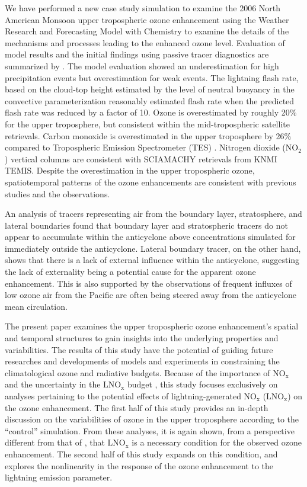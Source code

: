 We have performed a new case study simulation to examine the 2006 North American
Monsoon upper tropospheric ozone enhancement using the Weather Research and
Forecasting Model with Chemistry \citep{Skamarock:2008xx,Grell:2005fv}
to examine the details of the mechanisms and processes leading to the enhanced ozone level.
Evaluation of model results and the initial findings using passive tracer diagnostics are summarized
by \citet[][manscript in preparation]{Wong:2014xx}. The model evaluation showed an
underestimation for high precipitation events but overestimation for weak events. The
lightning flash rate, based on the cloud-top height estimated by the level of neutral
buoyancy in the convective parameterization \citet{Price:1992wb} reasonably estimated
flash rate when the predicted flash rate was reduced by a factor of 10. Ozone is
overestimated by roughly 20\% for the upper troposphere, but consistent within the mid-tropospheric
satellite retrievals. Carbon monoxide is overestimated in the upper troposphere by 26\%
compared to Tropospheric Emission Spectrometer (TES) \citep{Beer:2006fk}.
Nitrogen dioxide (NO$_2$) vertical columns are consistent with SCIAMACHY retrievals
from KNMI TEMIS. Despite the overestimation in the upper tropospheric ozone, spatiotemporal
patterns of the ozone enhancements are consistent with previous studies and the observations.

An analysis of tracers representing air from the boundary layer, stratosphere, and lateral
boundaries found that boundary layer and stratospheric tracers do not appear to accumulate
within the anticyclone above concentrations simulated for immediately outside the anticyclone.
Lateral boundary tracer, on the other hand, shows that there is a lack of external influence
within the anticyclone, suggesting the lack of externality being a potential cause for the
apparent ozone enhancement. This is also supported by the observations of frequent
influxes of low ozone air from the Pacific are often being steered away from the anticyclone
mean circulation.

The present paper examines the upper tropospheric ozone enhancement's spatial and
temporal structures to gain insights into the underlying properties and variabilities. The
results of this study have the potential of guiding future researches and developments of
models and experiments in constraining the climatological ozone and radiative budgets.
Because of the importance of $\mathrm{NO_x}$ \citep{Cooper:2009nx}
and the uncertainty in the $\mathrm{LNO_x}$ budget \citep{Schumann:2007fk}, this study focuses exclusively on analyses
pertaining to the potential effects of lightning-generated $\mathrm{NO_x}$ ($\mathrm{LNO_x}$)
on the ozone enhancement. The
first half of this study provides an in-depth discussion on the variabilities of ozone in the
upper troposphere according to the ``control'' simulation. From these analyses, it is again
shown, from a perspective different from that of \citet{Cooper:2007cr}, that $\mathrm{LNO_x}$
is a necessary condition for the observed ozone enhancement. The second half of this
study expands on this condition, and explores the nonlinearity in the response of the ozone
enhancement to the lightning emission parameter.

